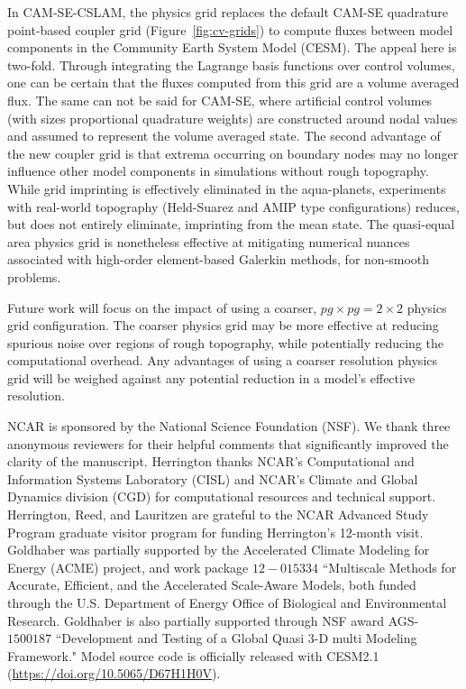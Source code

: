 \documentclass{ametsoc}
\begin{document}
{In CAM-SE-CSLAM, the physics grid replaces the default CAM-SE quadrature point-based coupler grid (Figure~\ref{fig:cv-grids}) to compute fluxes between model components in the Community Earth System Model (CESM). The appeal here is two-fold. Through integrating the Lagrange basis functions over control volumes, one can be certain that the fluxes computed from this grid are a volume averaged flux. The same can not be said for CAM-SE, where artificial control volumes (with sizes proportional quadrature weights) are constructed around nodal values and assumed to represent the volume averaged state. The second advantage of the new coupler grid is that extrema occurring on boundary nodes may no longer influence other model components in simulations without rough topography. While grid imprinting is effectively eliminated in the aqua-planets, experiments with real-world topography (Held-Suarez and AMIP type configurations) reduces, but does not entirely eliminate, imprinting from the mean state. The quasi-equal area physics grid is nonetheless effective at mitigating numerical nuances associated with high-order element-based Galerkin methods, for non-smooth problems. 

Future work will focus on the impact of using a coarser, $pg\times pg=2\times 2$ physics grid configuration. The coarser physics grid may be more effective at reducing spurious noise over regions of rough topography, while potentially reducing the computational overhead. Any advantages of using a coarser resolution physics grid will be weighed against any potential reduction in a model's effective resolution.

%
\acknowledgments
NCAR is sponsored by the National Science Foundation (NSF). We thank three anonymous reviewers for their helpful comments that significantly improved the clarity of the manuscript. Herrington thanks NCAR's Computational and Information Systems Laboratory (CISL) and NCAR's Climate and Global Dynamics division (CGD) for computational resources and technical support. Herrington, Reed, and Lauritzen are grateful to the NCAR Advanced Study Program graduate visitor program for funding Herrington's 12-month visit. Goldhaber was partially supported by the Accelerated Climate Modeling for Energy (ACME) project, and work package $12-015334$ ``Multiscale Methods for Accurate, Efficient, and the Accelerated Scale-Aware Models, both funded through the U.S. Department of Energy Office of Biological and Environmental Research. Goldhaber is also partially supported through NSF award AGS-$1500187$ ``Development and Testing of a Global Quasi 3-D multi Modeling Framework." Model source code is officially released with CESM2.1 (\url{https://doi.org/10.5065/D67H1H0V}).

}
\end{document}
